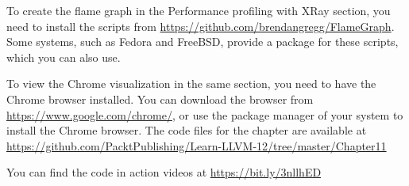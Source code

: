 To create the flame graph in the Performance profiling with XRay section, you need to install the scripts from \url{https://github.com/brendangregg/FlameGraph}. Some systems, such as Fedora and FreeBSD, provide a package for these scripts, which you can also use.\par

To view the Chrome visualization in the same section, you need to have the Chrome browser installed. You can download the browser from \url{https://www.google.com/chrome/}, or use the package manager of your system to install the Chrome browser. The code files for the chapter are available at \url{https://github.com/PacktPublishing/Learn-LLVM-12/tree/master/Chapter11}

You can find the code in action videos at \url{https://bit.ly/3nllhED}